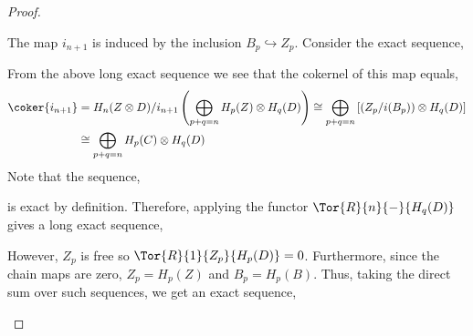 \documentclass[12pt]{extarticle}
\begin{document}
\begin{proof}
\begin{center}
\end{center}
The map $i_{n+1}$ is induced by the inclusion $B_p \hookrightarrow Z_p$. Consider the exact sequence,
\begin{center}
\end{center}
From the above long exact sequence we see that the cokernel of this map equals,
\begin{align*}
\coker{i_{n+1}} & = H_n(Z \otimes D) / i_{n+1}\left( \bigoplus\limits_{p+q = n} H_p(Z) \otimes H_q(D) \right) \cong  \bigoplus\limits_{p+q = n} \left[ \left( Z_p / i(B_p) \right) \otimes H_q(D) \right] 
\\
& \cong \bigoplus\limits_{p+q = n} H_p(C) \otimes H_q(D)
\end{align*}
Note that the sequence,
\begin{center}
\end{center}
is exact by definition. Therefore, applying the functor $\Tor{R}{n}{-}{H_q(D)}$ gives a long exact sequence,
\begin{center}
\end{center}
However, $Z_p$ is free so $\Tor{R}{1}{Z_p}{H_p(D)} = 0$. Furthermore, since the chain maps are zero, $Z_p = H_p(Z)$ and $B_p = H_p(B)$. Thus, taking the direct sum over such sequences, we get an exact sequence,
\begin{center}
\end{center}
\end{proof}
\end{document}
